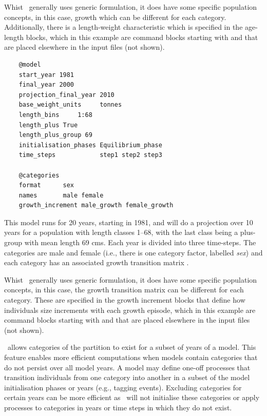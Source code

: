 Whist \CNAME\ generally uses generic formulation, it does have some specific population concepts, in this case, growth which can be different for each category. Additionally, there is a length-weight characteristic which is specified in the age-length blocks, which in this example are command blocks starting with  and  that are placed elsewhere in the input files (not shown).

\else
{\small{\begin{verbatim}
	@model
	start_year 1981
	final_year 2000
	projection_final_year 2010
	base_weight_units     tonnes
	length_bins	    1:68
	length_plus True
	length_plus_group 69
	initialisation_phases Equilibrium_phase
	time_steps            step1 step2 step3
	
	@categories
	format      sex
	names       male female
	growth_increment male_growth female_growth
\end{verbatim}}}

This model runs for 20 years, starting in 1981, and will do a projection over 10 years for a population with length classes 1--68, with the last class being a plus-group with mean length 69 cms. Each year is divided into three time-steps. The categories are male and female (i.e., there is one category factor, labelled \textit{sex}) and each category has an associated growth transition matrix .

Whist \CNAME\ generally uses generic formulation, it does have some specific population concepts, in this case, the growth transition matrix can be different for each category. These are specified in the growth increment blocks that define how individuals size increments with each growth episode, which in this example are command blocks starting with  and  that are placed elsewhere in the input files (not shown).
\fi

\CNAME\ allows categories of the partition to exist for a subset of years of a model. This feature enables more efficient computations when models contain categories that do not persist over all model years. A model may define one-off processes that transition individuals from one category into another in a subset of the model initialisation phases or years (e.g., tagging events). Excluding categories for certain years can be more efficient as \CNAME\ will not initialise these categories or apply processes to categories in years or time steps in which they do not exist.

